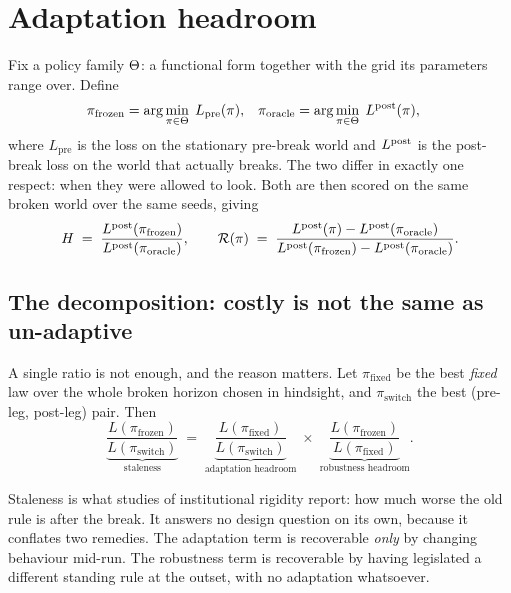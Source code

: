 \documentclass[11pt]{article}
\begin{document}
\section{Adaptation headroom}
\label{sec:headroom}

Fix a policy family $\Theta$: a functional form together with the grid its parameters range
over. Define
\begin{align}
\pi_{\mathrm{frozen}} &= \arg\min_{\pi \in \Theta} \; L_{\mathrm{pre}}(\pi),
&\pi_{\mathrm{oracle}} &= \arg\min_{\pi \in \Theta} \; L^{\mathrm{post}}(\pi),
\end{align}
where $L_{\mathrm{pre}}$ is the loss on the stationary pre-break world and $L^{\mathrm{post}}$ is the
post-break loss on the world that actually breaks. The two differ in exactly one respect: when they
were allowed to look. Both are then scored on the same broken world over the same seeds, giving
\begin{equation}
H \;=\; \frac{L^{\mathrm{post}}(\pi_{\mathrm{frozen}})}{L^{\mathrm{post}}(\pi_{\mathrm{oracle}})},
\qquad
\mathcal{R}(\pi) \;=\;
\frac{L^{\mathrm{post}}(\pi) - L^{\mathrm{post}}(\pi_{\mathrm{oracle}})}
     {L^{\mathrm{post}}(\pi_{\mathrm{frozen}}) - L^{\mathrm{post}}(\pi_{\mathrm{oracle}})}.
\end{equation}

\subsection{The decomposition: costly is not the same as un-adaptive}
\label{sec:decomposition}

A single ratio is not enough, and the reason matters. Let $\pi_{\mathrm{fixed}}$ be the best
\emph{fixed} law over the whole broken horizon chosen in hindsight, and $\pi_{\mathrm{switch}}$ the
best (pre-leg, post-leg) pair. Then
\begin{equation}
\underbrace{\frac{L(\pi_{\mathrm{frozen}})}{L(\pi_{\mathrm{switch}})}}_{\text{staleness}}
\;=\;
\underbrace{\frac{L(\pi_{\mathrm{fixed}})}{L(\pi_{\mathrm{switch}})}}_{\text{adaptation headroom}}
\;\times\;
\underbrace{\frac{L(\pi_{\mathrm{frozen}})}{L(\pi_{\mathrm{fixed}})}}_{\text{robustness headroom}} .
\end{equation}

Staleness is what studies of institutional rigidity report: how much worse the old rule is after the
break. It answers no design question on its own, because it conflates two remedies. The adaptation
term is recoverable \emph{only} by changing behaviour mid-run. The robustness term is recoverable by
having legislated a different standing rule at the outset, with no adaptation whatsoever.
\end{document}
